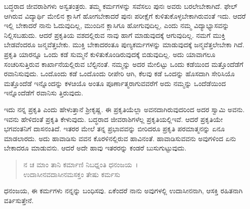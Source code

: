 ಬದ್ಧರಾದ ಜೀವರಾಶಿಗಳು ಅಸ್ವತಂತ್ರರು. ತಮ್ಮ ಕರ್ಮಗಳನ್ನು ಸವೆಸಲು ಪುನಃ ಅವರು ಬರಲೇಬೇಕಾಗಿದೆ. ಫೇಲ್ ಆಗಿರುವ ವಿದ್ಯಾರ್ಥಿ ಮೇಲಿನ ಕ್ಲಾಸಿಗೆ ಹೋಗಬೇಕಾದರೆ ಪುನಃ ಪರೀಕ್ಷೆಗೆ ಕುಳಿತುಕೊಳ್ಳಬೇಕಾಗಿರುವಂತೆ ಇದು. ಆದರೆ ಇಲ್ಲಿ ಬೇಕಾದರೆ ನಾನು ಓದುವುದಿಲ್ಲ, ಮುಂದಿನ ಕ್ಲಾಸಿಗೂ ಹೋಗುವುದಿಲ್ಲ, ಎಂದು ನಮ್ಮ ವಿದ್ಯಾಭ್ಯಾಸವನ್ನು ನಿಲ್ಲಿಸಬಹುದು. ಆದರೆ ಪ್ರಕೃತಿಯ ವಶದಲ್ಲಿರುವ ನಾವು ಹಾಗೆ ಮಾಡುವುದಕ್ಕೆ ಆಗುವುದಿಲ್ಲ. ನಮಗೆ ಮುಕ್ತಿ ಬೇಡವೆಂದರೂ ಜನ್ಮವೆತ್ತಬೇಕು. ಮುಕ್ತಿ ಬೇಕಾದರಂತೂ ಪುಣ್ಯಕರ್ಮಗಳನ್ನು ಮಾಡುವುದಕ್ಕೆ ಜನ್ಮವೆತ್ತಲೇಬೇಕಾ ಗಿದೆ. ಪ್ರಕೃತಿ ಯಾರನ್ನೂ ಒಂದು ಕಡೆ ಸುಮ್ಮನೆ ಕುಳಿತುಕೊಂಡಿರುವುದಕ್ಕೆ ಬಿಡುವುದಿಲ್ಲ. ಅದು ಯಾವಾಗಲೂ ಸಂಚರಿಸುತ್ತಿರುವ ಕಾರ್ಖಾನೆಯಲ್ಲಿರುವ ಬೆಲ್ಟಿನಂತೆ. ನಮ್ಮನ್ನು ಅದರ ಮೇಲಿಟ್ಟು ಒಂದು ಕಡೆಯಿಂದ ಮತ್ತೊಂದೆಡೆಗೆ ರವಾನಿಸುವುದು. ಒಂದೊಂದು ಕಡೆ ಒಂದೊಂದು ರೀಪೇರಿ ಆಗಿ, ಕೆಲವು ಕಡೆ ಒಂದನ್ನು ಹೊಸದಾಗಿ ಸೇರಿಸಿಯೊ ಮತ್ತೊಂದೆಡೆ ಇನ್ನೊಂದನ್ನು ಕಳಚಿಯೊ ಅಂತೂ ಪೂರ್ಣಾತ್ಮರಾಗುವವರೆಗೆ ಅದು ನಮ್ಮನ್ನು ಒಂದೆಡೆಯಿಂದ ಇನ್ನೊಂದೆಡೆಗೆ ರವಾನಿಸು ತ್ತಿರುವುದು.

ಇದು ನನ್ನ ಪ್ರಕೃತಿ ಎಂದು ಹೇಳುತ್ತಾನೆ ಶ‍್ರೀಕೃಷ್ಣ. ಈ ಪ್ರಕೃತಿಯೆಲ್ಲಾ ಅವನದಾಗಿರುವುದರಿಂದ ಅದರ ಸ್ವಾಮಿ ಅವನು. ಇವನು ಹೇಳಿದಂತೆ ಪ್ರಕೃತಿ ಕೇಳುವುದು. ಬದ್ಧರಾದ ಜೀವರಾಶಿಗಳೆಲ್ಲ ಪ್ರಕೃತಿಯಲ್ಲಿಇವೆ. ಆದರೆ ಪ್ರಕೃತಿಯೇ ಭಗವಂತನಿಗೆ ದಾಸನಂತಿದೆ. ಇತರರ ಮೇಲೆ ತನ್ನ ಪ್ರಭಾವವನ್ನು ಬೀರಿದರೂ ಪ್ರಕೃತಿ ಪರಮಾತ್ಮನನ್ನು ಏನೂ ಮಾಡಲಾರದು. ಅದು ಹಾವಾಡಿಸು ವವನ ಕೊರಳಿನಲ್ಲಿರುವ ಹಾವಿನಂತೆ. ಹಾವಾಡಿಸುವವನು ಅವುಗಳಿಂದ ಏನು ಬೇಕಾದರೂ ಮಾಡುವನು. ಆದರೆ ಅದೇ ಹಾವು ಇತರರನ್ನು ಕಂಡರೆ ಬುಸುಗುಟ್ಟುವುದು.

\begin{verse}
ನ ಚ ಮಾಂ ತಾನಿ ಕರ್ಮಾಣಿ ನಿಬಧ್ನಂತಿ ಧನಂಜಯ~।\\ಉದಾಸೀನವದಾಸೀನಮಸಕ್ತಂ ತೇಷು ಕರ್ಮಸು 
\end{verse}

{\small ಧನಂಜಯ, ಈ ಕರ್ಮಗಳು ನನ್ನನ್ನು ಬಂಧಿಸವು. ಏಕೆಂದರೆ ನಾನು ಅವುಗಳಲ್ಲಿ ಉದಾಸೀನನಾಗಿ, ಆಸಕ್ತಿ ರಹಿತನಾಗಿ ವರ್ತಿಸುತ್ತೇನೆ.}

